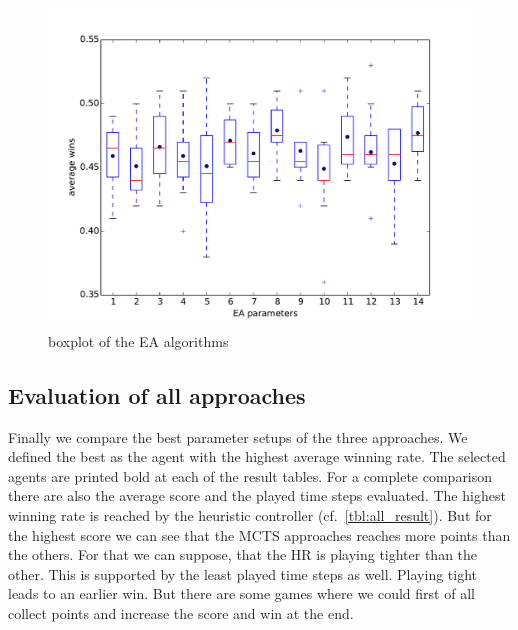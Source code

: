 \begin{figure}[H]
\centering
\includegraphics[scale=0.6]{images/eval_evolutionary.pdf}
\caption{boxplot of the \ac{EA} algorithms}
\label{fig:eval_evo}
\end{figure}




\subsection{Evaluation of all approaches} 

Finally we compare the best parameter setups of the three approaches. We defined the best as the agent with the highest average winning rate.
The selected agents are printed bold at each of the result tables.
For a complete comparison there are also the average score and the played time steps evaluated.
The highest winning rate is reached by the heuristic controller (cf.~\cref{tbl:all_result}).
But for the highest score we can see that the \ac{MCTS} approaches reaches more points than the others.
For that we can suppose, that the \ac{HR} is playing tighter than the other. This is supported by the least played time steps as well.
Playing tight leads to an earlier win. But there are some games where we could first of all collect points and increase the score and
win at the end.


